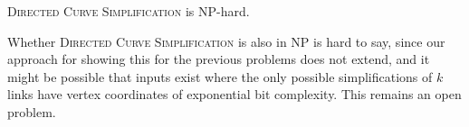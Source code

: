 \documentclass[]{llncs}
\newcommand{\curvesimp}{\textsc{Directed Curve Simplification}\xspace}
\begin{document}

\begin{theorem}  
\label{thm:finalcellhard2}
  \curvesimp is NP-hard.
\end{theorem}  



Whether \curvesimp is also in NP is hard to say, since our approach for showing this for the previous problems does not extend, and it might be possible that inputs exist where the only possible simplifications of $k$ links have vertex coordinates of exponential bit complexity. This remains an open problem.
\end{document}
